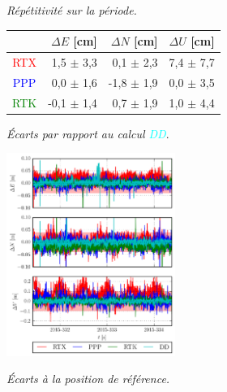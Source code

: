 \documentclass[portrait,final,a0paper,fontscale=0.3]{baposter}
\begin{document}
\begin{poster}
{\begin{minipage}[c]{0.5\textwidth}
		\smallskip
		{\footnotesize\it Répétitivité sur la période.}\\
		
		\medskip
		\small
		\begin{tabular}{crrr}
			\hline
			 & $\Delta E$ [cm] & $\Delta N$ [cm]& $\Delta U$ [cm]\\
			\hline
			\textcolor{red}{RTX}   &  1,5 $\pm$ 3,3 &  0,1 $\pm$ 2,3 & 7,4 $\pm$ 7,7\\
			\textcolor{blue}{PPP}  &  0,0 $\pm$ 1,6 & -1,8 $\pm$ 1,9 & 0,0 $\pm$ 3,5\\
			\textcolor{green}{RTK} & -0,1 $\pm$ 1,4 &  0,7 $\pm$ 1,9 & 1,0 $\pm$ 4,4\\
			\hline
		\end{tabular}
		
		\smallskip
		{\footnotesize\it Écarts par rapport au calcul \textcolor{cyan}{DD}}.\\
	\end{minipage}
	\begin{minipage}[c]{0.49\textwidth}
		\centering
		\includegraphics[width=5.5cm]{figures/3_statique.png}
		
		\vspace{-0.2cm}
		{\footnotesize\it Écarts à la position de référence.}\\
	\end{minipage}

}

\end{poster}
\end{document}
